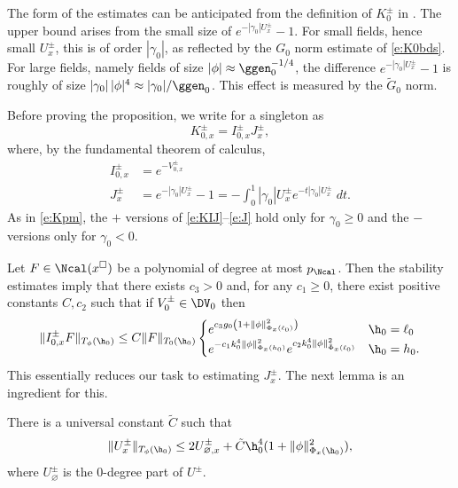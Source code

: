 The form of the estimates  can be anticipated from the definition of
$K_0^\pm$ in .  The upper bound arises from the small size of
$e^{-|\gamma_0|U_x^\pm}-1$.  For small fields, hence small $U_x^\pm$, this is of order $|\gamma_0|$,
as reflected by the $G_0$ norm estimate of \eqref{e:K0bds}.
For large fields, namely fields of size $|\phi| \approx \ggen_{0}^{-1/4}$, the difference
$e^{-|\gamma_0|U_x^\pm}-1$ is roughly of size $|\gamma_0|\,|\phi|^4 \approx |\gamma_0|/\ggen_0$.
This effect is measured by the $\tilde G_0$ norm.

Before proving the proposition, we
write  for a singleton as
\begin{equation}
K^\pm_{0,x} = I^\pm_{0,x} J^\pm_x
  \label{e:KIJ},
\end{equation}
where, by the fundamental theorem of calculus,
\begin{align}
    I^\pm_{0,x} &= e^{-V^\pm_{0,x}} \\
    J^\pm_x
    &= e^{-|\gamma_0|U^\pm_x} - 1
    = - \int_0^{1} |\gamma_0| U^\pm_x e^{-t |\gamma_0| U^\pm_x} \; dt.
\label{e:J}
\end{align}
As in \eqref{e:Kpm}, the $+$ versions of \eqref{e:KIJ}--\eqref{e:J} hold
only for $\gamma_0 \geq 0$ and the $-$ versions only for $\gamma_0 < 0$.

Let $F \in \Ncal(x^\square)$ be a polynomial of degree at most $p_\Ncal$.
Then the stability estimates \cite[\eqref{IE-e:Iupper-a}--\eqref{IE-e:Iupper-b}]{BS-rg-IE}
imply that there exists $c_3 > 0$ and, for any $c_1 \geq 0$,
there exist positive constants $C, c_2$ such that
if $V_0^\pm \in \DV_0$ then
\begin{equation}
\label{e:Iupper}
\|I^\pm_{0,x} F\|_{T_\phi(\h_0)}
  \leq
C \|F\|_{T_0(\h_0)}
\begin{cases}
  e^{c_3 g_0 \left(1 + \|\phi\|^2_{\Phi_x(\ell_0)}\right)}
    & \h_0 = \ell_0 \\
  e^{-c_1 k_0^4 \|\phi\|^2_{\Phi_x(h_0)}} e^{c_2 k_0^4 \|\phi\|^2_{\tilde\Phi_x(\ell_0)}}
    & \h_0 = h_0.
\end{cases}
\end{equation}
This essentially reduces our task to estimating $J^\pm_x$.
The next lemma is an ingredient for this.

\begin{lemma}
\label{lem:FFnull-loc}
There is a universal constant $\tilde C$ such that
\begin{equation}
\label{e:FFnull}
\|U^\pm_x\|_{T_\phi(\h_0)}
  \leq
2 U^\pm_{\varnothing,x} + \tilde C \h_0^4 (1 + \|\phi\|^2_{\Phi_x(\h_0)}),
\end{equation}
where $U^\pm_\varnothing$ is the 0-degree part of $U^\pm$.
\end{lemma}

